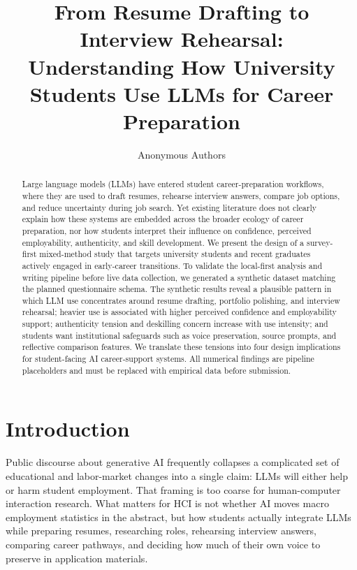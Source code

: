 \documentclass[sigconf,review,anonymous]{acmart}
\title{From Resume Drafting to Interview Rehearsal: Understanding How
  University Students Use LLMs for Career Preparation}
\author{Anonymous Authors}
\affiliation{%
  \institution{Anonymous Institution}
  \city{Anonymous City}
  \country{Anonymous Country}}
\begin{document}

\begin{abstract}
Large language models (LLMs) have entered student career-preparation
workflows, where they are used to draft resumes, rehearse interview answers,
compare job options, and reduce uncertainty during job search.  Yet existing
literature does not clearly explain how these systems are embedded across
the broader ecology of career preparation, nor how students interpret their
influence on confidence, perceived employability, authenticity, and skill
development.  We present the design of a survey-first mixed-method study
that targets university students and recent graduates actively engaged in
early-career transitions.  To validate the local-first analysis and writing
pipeline before live data collection, we generated a synthetic dataset
matching the planned questionnaire schema.  The synthetic results reveal a
plausible pattern in which LLM use concentrates around resume drafting,
portfolio polishing, and interview rehearsal; heavier use is associated with
higher perceived confidence and employability support; authenticity tension
and deskilling concern increase with use intensity; and students want
institutional safeguards such as voice preservation, source prompts, and
reflective comparison features.  We translate these tensions into four
design implications for student-facing AI career-support systems.  All
numerical findings are pipeline placeholders and must be replaced with
empirical data before submission.
\end{abstract}

\maketitle

\section{Introduction}

Public discourse about generative AI frequently collapses a complicated
set of educational and labor-market changes into a single claim: LLMs will
either help or harm student employment.  That framing is too coarse for
human-computer interaction research.  What matters for HCI is not whether
AI moves macro employment statistics in the abstract, but how students
actually integrate LLMs while preparing resumes, researching roles,
rehearsing interview answers, comparing career pathways, and deciding how
much of their own voice to preserve in application materials.
\end{document}
